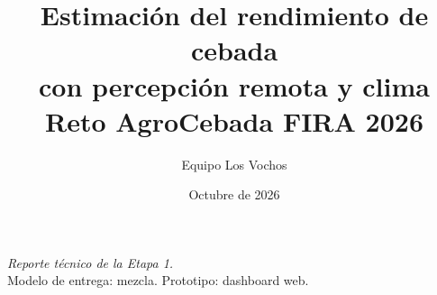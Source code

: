 \documentclass[11pt,a4paper]{article}
\title{Estimación del rendimiento de cebada\\con percepción remota y clima\\[0.4em]
\large Reto AgroCebada FIRA 2026}
\author{Equipo Los Vochos}
\date{Octubre de 2026}
\begin{document}
\maketitle
\begin{center}
\textit{Reporte técnico de la Etapa 1.}\\
Modelo de entrega: mezcla. Prototipo: dashboard web.
\end{center}
\vspace{0.6em}












\appendix

\end{document}
